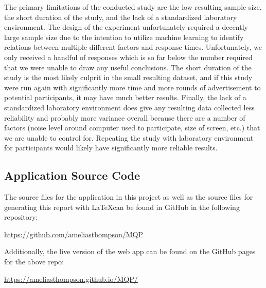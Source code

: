 \documentclass[12pt]{report}
\begin{document}
The primary limitations of the conducted study are the low resulting sample size, the short duration of the study, and the lack of a standardized laboratory environment. The design of the experiment unfortunately required a decently large sample size due to the intention to utilize machine learning to identify relations between multiple different factors and response times. Unfortunately, we only received a handful of responses which is so far below the number required that we were unable to draw any useful conclusions. The short duration of the study is the most likely culprit in the small resulting dataset, and if this study were run again with significantly more time and more rounds of advertisement to potential participants, it may have much better results. Finally, the lack of a standardized laboratory environment does give any resulting data collected less reliability and probably more variance overall because there are a number of factors (noise level around computer used to participate, size of screen, etc.) that we are unable to control for. Repeating the study with laboratory environment for participants would likely have significantly more reliable results.




%

\begin{appendices}

\chapter{Application Source Code}
\label{ch:App Source Code}

The source files for the application in this project as well as the source files for generating this report with \LaTeX can be found in GitHub in the following repository:

\noindent\url{https://github.com/ameliasthompson/MQP}

\noindent Additionally, the live version of the web app can be found on the GitHub pages for the above repo:

\noindent\url{https://ameliasthompson.github.io/MQP/}

\end{appendices}
\end{document}
